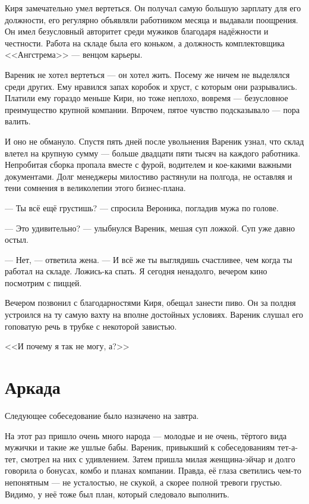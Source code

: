 \documentclass[a4paper,10pt,fleqn]{book}\usepackage{polyglossia}\setdefaultlanguage{english}\setotherlanguage{russian}\defaultfontfeatures{Ligatures=TeX,Mapping=tex-text} \usepackage{xcolor}\definecolor{lightgray}{HTML}{bbbbbb}\color{lightgray}\newcommand{\ml}[3]{\textcolor{black}{#3}}
\begin{document}
Киря замечательно умел вертеться.
Он получал самую большую зарплату для его должности, его регулярно объявляли работником месяца и выдавали поощрения.
Он имел безусловный авторитет среди мужиков благодаря надёжности и честности.
Работа на складе была его коньком, а должность комплектовщика <<Ангстрема>> --- венцом карьеры.

Вареник не хотел вертеться --- он хотел жить.
Посему же ничем не выделялся среди других.
Ему нравился запах коробок и хруст, с которым они разрывались.
Платили ему гораздо меньше Кири, но тоже неплохо, вовремя --- безусловное преимущество крупной компании.
Впрочем, пятое чувство подсказывало --- пора валить.

И оно не обмануло.
Спустя пять дней после увольнения Вареник узнал, что склад влетел на крупную сумму --- больше двадцати пяти тысяч на каждого работника.
Непробитая сборка пропала вместе с фурой, водителем и кое-какими важными документами.
Долг менеджеры милостиво растянули на полгода, не оставляя и тени сомнения в великолепии этого бизнес-плана.

--- Ты всё ещё грустишь? --- спросила Вероника, погладив мужа по голове.

--- Это удивительно? --- улыбнулся Вареник, мешая суп ложкой.
Суп уже давно остыл.

--- Нет, --- ответила жена.
--- И всё же ты выглядишь счастливее, чем когда ты работал на складе.
Ложись-ка спать.
Я сегодня ненадолго, вечером кино посмотрим с пиццей.

Вечером позвонил с благодарностями Киря, обещал занести пиво.
Он за полдня устроился на ту самую вахту на вполне достойных условиях.
Вареник слушал его гоповатую речь в трубке с некоторой завистью.

<<И почему я так не могу, а?>>

\section{Аркада}

Следующее собеседование было назначено на завтра.

На этот раз пришло очень много народа --- молодые и не очень, тёртого вида мужички и такие же ушлые бабы.
Вареник, привыкший к собеседованиям тет-а-тет, смотрел на них с удивлением.
Затем пришла милая женщина-эйчар и долго говорила о бонусах, комбо и планах компании.
Правда, её глаза светились чем-то непонятным --- не усталостью, не скукой, а скорее полной тревоги грустью.
Видимо, у неё тоже был план, который следовало выполнить.
\end{document}
